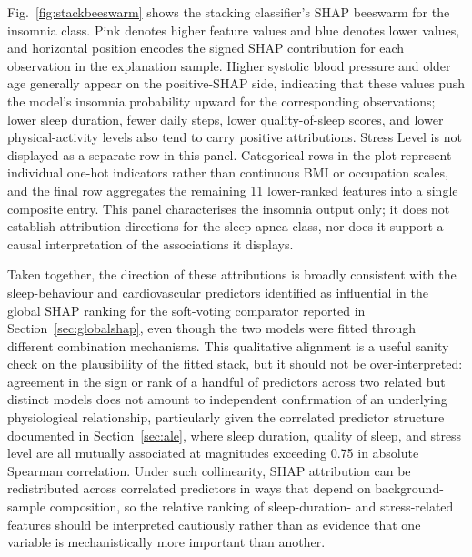 \documentclass[a4paper,fleqn]{cas-dc}
\begin{document}
Fig.~\ref{fig:stackbeeswarm} shows the stacking classifier's SHAP beeswarm for the insomnia class. Pink denotes higher feature values and blue denotes lower values, and horizontal position encodes the signed SHAP contribution for each observation in the explanation sample. Higher systolic blood pressure and older age generally appear on the positive-SHAP side, indicating that these values push the model's insomnia probability upward for the corresponding observations; lower sleep duration, fewer daily steps, lower quality-of-sleep scores, and lower physical-activity levels also tend to carry positive attributions. Stress Level is not displayed as a separate row in this panel. Categorical rows in the plot represent individual one-hot indicators rather than continuous BMI or occupation scales, and the final row aggregates the remaining 11 lower-ranked features into a single composite entry. This panel characterises the insomnia output only; it does not establish attribution directions for the sleep-apnea class, nor does it support a causal interpretation of the associations it displays.
 
Taken together, the direction of these attributions is broadly consistent with the sleep-behaviour and cardiovascular predictors identified as influential in the global SHAP ranking for the soft-voting comparator reported in Section~\ref{sec:globalshap}, even though the two models were fitted through different combination mechanisms. This qualitative alignment is a useful sanity check on the plausibility of the fitted stack, but it should not be over-interpreted: agreement in the sign or rank of a handful of predictors across two related but distinct models does not amount to independent confirmation of an underlying physiological relationship, particularly given the correlated predictor structure documented in Section~\ref{sec:ale}, where sleep duration, quality of sleep, and stress level are all mutually associated at magnitudes exceeding 0.75 in absolute Spearman correlation. Under such collinearity, SHAP attribution can be redistributed across correlated predictors in ways that depend on background-sample composition, so the relative ranking of sleep-duration- and stress-related features should be interpreted cautiously rather than as evidence that one variable is mechanistically more important than another.
 
\end{document}
